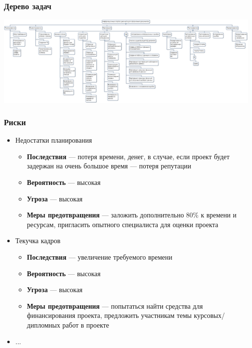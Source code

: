 \documentclass{../../slides-style}
\begin{document}
    \begin{frame}
        \frametitle{Дерево задач}
        \begin{center}
            \includegraphics[width=\textwidth]{wbs.png}
        \end{center}
    \end{frame}

    \begin{frame}
        \frametitle{Риски}
        \begin{itemize}
            \item Недостатки планирования
            \begin{itemize}
                \item \textbf{Последствия} --- потеря времени, денег, в случае, если проект будет задержан на очень большое время --- потеря репутации
                \item \textbf{Вероятность} --- высокая
                \item \textbf{Угроза} --- высокая
                \item \textbf{Меры предотвращения} --- заложить дополнительно 80\% к времени и ресурсам, пригласить опытного специалиста для оценки проекта
            \end{itemize}
            \item Текучка кадров
            \begin{itemize}
                \item \textbf{Последствия} --- увеличение требуемого времени
                \item \textbf{Вероятность} --- высокая
                \item \textbf{Угроза} --- высокая
                \item \textbf{Меры предотвращения} --- попытаться найти средства для финансирования проекта, предложить участникам темы курсовых/дипломных работ в проекте
            \end{itemize}
            \item ...
        \end{itemize}
    \end{frame}
\end{document}
